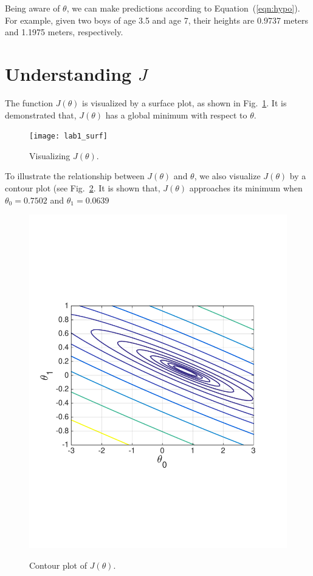 \documentclass[10pt,a4paper]{article}
\begin{document}
  Being aware of $\theta$, we can make predictions according to Equation~(\ref{eqn:hypo}). For example, given two boys of age 3.5 and age 7, their heights are 0.9737 meters and 1.1975 meters, respectively.



\section{Understanding $J$}
%
  The function $J(\theta)$ is visualized by a surface plot, as shown in Fig.~\ref{fig:surf}. It is demonstrated that, $J(\theta)$ has a global minimum with respect to $\theta$.
  \begin{figure}[htb!]
  \centering
    \texttt{[image: lab1\_surf]} \\ %
  \caption{Visualizing $J(\theta)$.}
  \label{fig:surf}
  \end{figure}

  To illustrate the relationship between $J(\theta)$ and $\theta$, we also visualize $J(\theta)$ by a contour plot (see Fig.~\ref{fig:contour}. It is shown that, $J(\theta)$ approaches its minimum when $\theta_0=0.7502$ and $\theta_1=0.0639$
  \begin{figure}[htb!]
  \centering
    \includegraphics[width=.7\columnwidth]{lab1_contour} \\ %
  \caption{Contour plot of $J(\theta)$.}
  \label{fig:contour}
  \end{figure}
\end{document}

